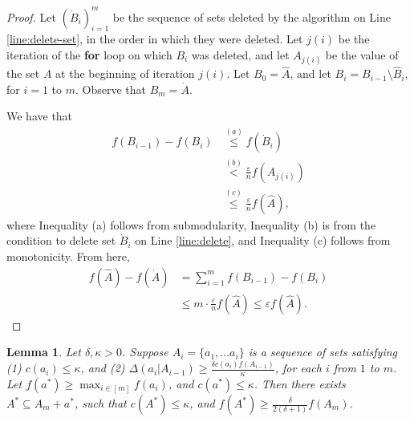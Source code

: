 \documentclass{article}
\newtheorem{lemma}{Lemma}
\theoremstyle{definition}
\newcommand{\epsi}{\varepsilon}
\newcommand{\marge}[2]{ \Delta \left( #1 | #2 \right) }
\begin{document}
\begin{proof}
  Let $( \dot B_i )_{i=1}^m$ be the sequence of sets deleted by the algorithm on
  Line \ref{line:delete-set}, in the order in which they were deleted.
  Let $j(i)$ be the iteration of the \textbf{for} loop on which $B_i$
  was deleted, and let $A_{j(i)}$ be the value of the set $A$ at the
  beginning of iteration $j(i)$. Let $B_0 = \hat A$, and let
  $B_i = B_{i-1} \setminus \hat B_i$, for $i = 1$ to $m$.
  Observe that $B_m = \dot A$.

  We have that
  \begin{align*}
    f( B_{i-1} ) - f(B_i) &\overset{(a)}{\le} f( \dot B_i ) \\
                          &\overset{(b)}{<} \frac{\epsi}{n} f( A_{j(i)} ) \\
                          &\overset{(c)}{\le} \frac{\epsi}{n} f( \hat A ),
  \end{align*}
  where Inequality (a) follows from submodularity,
  Inequality (b) is from the condition to delete set $\dot B_i$ on Line \ref{line:delete},
  and Inequality (c) follows from monotonicity.
  From here,
  \begin{align*}
    f( \hat A ) - f( \dot A ) &= \sum_{i=1}^m f( B_{i-1} ) - f( B_i ) \\
    &\le m \cdot \frac{\epsi}{n} f( \hat A ) \le \epsi f( \hat A ). 
  \end{align*}
\end{proof}
\begin{lemma} \label{lemma:value-inside-A}
  Let $\delta, \kappa > 0$. Suppose $A_i = \{ a_1, \ldots a_i \}$ is a sequence of sets satisfying
  (1) $c(a_i) \le \kappa$, and (2) $\marge{ a_i }{ A_{i - 1} } \ge \frac{\delta c( a_i ) f( A_{i -1 } ) }{ \kappa }$,
  for each $i$ from $1$ to $m$. Let $f( a^* ) \ge \max_{i \in [m]} f(a_i)$, and $c(a^*) \le \kappa$.
  Then there exists $A^* \subseteq A_m + a^*$, such that $c( A^* ) \le \kappa$, and $f( A^* ) \ge \frac{ \delta }{2(\delta + 1)} f(A_m)$.
\end{lemma}
\end{document}
